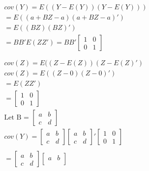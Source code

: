 \documentclass[oneside, a4paper]{article}
\begin{document}
\begin{equation}
    \begin{split}
        cov(Y) = E((Y - E(Y)) (Y - E(Y))) \\
        = E((a + BZ - a) (a + BZ - a)') \\
        = E((BZ) (BZ)') \\
        = BB'E(ZZ') = BB' \begin{bmatrix}
            1 & 0 \\
            0 & 1 
        \end{bmatrix}\\ \\ \\
        cov(Z) = E((Z - E(Z)) (Z - E(Z)') \\
        cov(Z) = E((Z - 0) (Z - 0)') \\
        = E(ZZ') \\
        = \begin{bmatrix}
            1 & 0 \\
            0 & 1 
        \end{bmatrix}\\
        \text{Let B = } 
            \begin{bmatrix}
                a & b \\
                c & d 
            \end{bmatrix}\\
        cov(Y) = 
            \begin{bmatrix}
                a & b \\
                c & d 
            \end{bmatrix} 
            \begin{bmatrix}
                a & b \\
                c & d 
            \end{bmatrix} ' 
            \begin{bmatrix}
                1 & 0 \\
                0 & 1 
            \end{bmatrix} \\ \\
        = 
            \begin{bmatrix}
                a & b \\
                c & d 
            \end{bmatrix} 
            \begin{bmatrix}
                a & b \\

\end{bmatrix}
\end{split}
\end{equation}
\end{document}
